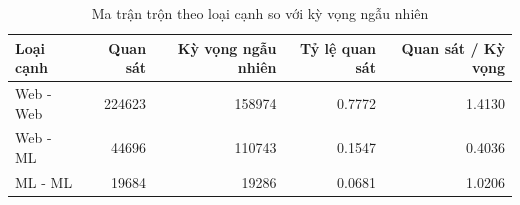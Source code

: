 \begin{table}[htbp]
\caption{Ma trận trộn theo loại cạnh so với kỳ vọng ngẫu nhiên}
\label{tab:rq1_mixing}
\begin{tabular}{lrrrr}
\toprule
Loại cạnh & Quan sát & Kỳ vọng ngẫu nhiên & Tỷ lệ quan sát & Quan sát / Kỳ vọng \\
\midrule
Web - Web & 224623 & 158974 & 0.7772 & 1.4130 \\
Web - ML & 44696 & 110743 & 0.1547 & 0.4036 \\
ML - ML & 19684 & 19286 & 0.0681 & 1.0206 \\
\bottomrule
\end{tabular}
\end{table}
